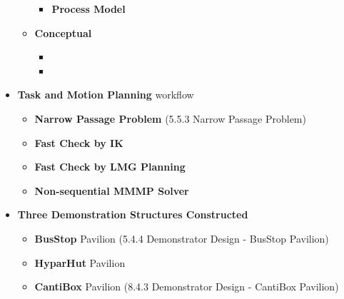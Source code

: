 \begin{itemize}
\begin{itemize}
\begin{itemize}
	\item \textbf{Process Model} 

\end{itemize}
	\item \textbf{Conceptual}

\begin{itemize}
	\item {}

	\item {}

\end{itemize}
\end{itemize}
\end{itemize}

\begin{itemize}
	\item \textbf{Task and Motion Planning }workflow 

\begin{itemize}
	\item \textbf{Narrow Passage Problem }(5.5.3 Narrow Passage Problem)

	\item \textbf{Fast Check by IK} 

	\item \textbf{Fast Check by LMG Planning} 

	\item \textbf{Non-sequential MMMP Solver} 

\end{itemize}
	\item \textbf{Three Demonstration Structures Constructed}

\begin{itemize}
	\item \textbf{BusStop }Pavilion (5.4.4 Demonstrator Design - BusStop Pavilion)

	\item \textbf{HyparHut }Pavilion 

	\item \textbf{CantiBox }Pavilion (8.4.3 Demonstrator Design  - CantiBox Pavilion)

\end{itemize}
\end{itemize}
